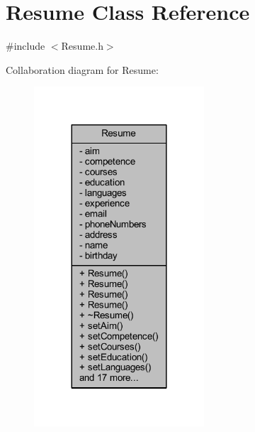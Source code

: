 \hypertarget{class_resume}{}\section{Resume Class Reference}
\label{class_resume}


{\ttfamily \#include $<$Resume.\+h$>$}



Collaboration diagram for Resume\+:
\nopagebreak
\begin{figure}[H]
\begin{center}
\leavevmode
\includegraphics[width=180pt]{class_resume__coll__graph}
\end{center}
\end{figure}
